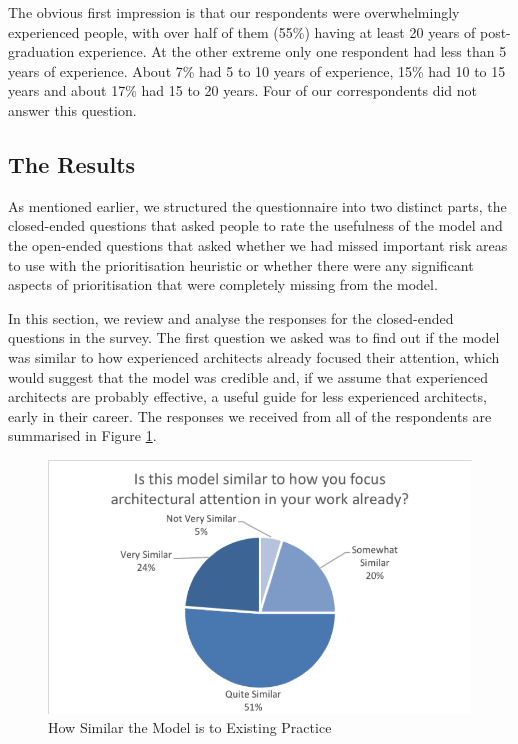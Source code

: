 The obvious first impression is that our respondents were overwhelmingly experienced people, with over half of them (55\%) having at least 20 years of post-graduation experience.  At the other extreme only one respondent had less than 5 years of experience.  About 7\% had 5 to 10 years of experience, 15\% had 10 to 15 years and about 17\% had 15 to 20 years.  Four of our correspondents did not answer this question.

\subsection{The Results}

As mentioned earlier, we structured the questionnaire into two distinct parts, the closed-ended questions that asked people to rate the usefulness of the model and the open-ended questions that asked whether we had missed important risk areas to use with the prioritisation heuristic or whether there were any significant aspects of prioritisation that were completely missing from the model.

In this section, we review and analyse the responses for the closed-ended questions in the survey.
The first question we asked was to find out if the model was similar to how experienced architects already focused their attention, which would suggest that the model was credible and, if we assume that experienced architects are probably effective, a useful guide for less experienced architects, early in their career.  The responses we received from all of the respondents are summarised in Figure \ref{figure:similarity}.
 
\begin{figure}
\centering
\includegraphics[width=12cm]{Figures/prioritisation-similarity}
\caption{How Similar the Model is to Existing Practice}
\label{figure:similarity}
\end{figure}

